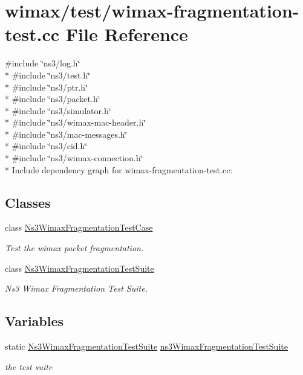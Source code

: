 \hypertarget{wimax-fragmentation-test_8cc}{}\section{wimax/test/wimax-\/fragmentation-\/test.cc File Reference}
\label{wimax-fragmentation-test_8cc}
{\ttfamily \#include \char`\"{}ns3/log.\+h\char`\"{}}\\*
{\ttfamily \#include \char`\"{}ns3/test.\+h\char`\"{}}\\*
{\ttfamily \#include \char`\"{}ns3/ptr.\+h\char`\"{}}\\*
{\ttfamily \#include \char`\"{}ns3/packet.\+h\char`\"{}}\\*
{\ttfamily \#include \char`\"{}ns3/simulator.\+h\char`\"{}}\\*
{\ttfamily \#include \char`\"{}ns3/wimax-\/mac-\/header.\+h\char`\"{}}\\*
{\ttfamily \#include \char`\"{}ns3/mac-\/messages.\+h\char`\"{}}\\*
{\ttfamily \#include \char`\"{}ns3/cid.\+h\char`\"{}}\\*
{\ttfamily \#include \char`\"{}ns3/wimax-\/connection.\+h\char`\"{}}\\*
Include dependency graph for wimax-\/fragmentation-\/test.cc\+:
\subsection*{Classes}
\begin{DoxyCompactItemize}
\item 
class \hyperlink{classNs3WimaxFragmentationTestCase}{Ns3\+Wimax\+Fragmentation\+Test\+Case}
\begin{DoxyCompactList}\small\item\em Test the wimax packet fragmentation. \end{DoxyCompactList}\item 
class \hyperlink{classNs3WimaxFragmentationTestSuite}{Ns3\+Wimax\+Fragmentation\+Test\+Suite}
\begin{DoxyCompactList}\small\item\em Ns3 Wimax Fragmentation Test Suite. \end{DoxyCompactList}\end{DoxyCompactItemize}
\subsection*{Variables}
\begin{DoxyCompactItemize}
\item 
static \hyperlink{classNs3WimaxFragmentationTestSuite}{Ns3\+Wimax\+Fragmentation\+Test\+Suite} \hyperlink{wimax-fragmentation-test_8cc_ad8dbda94d3a9d7f77b8bed10c342b60b}{ns3\+Wimax\+Fragmentation\+Test\+Suite}
\begin{DoxyCompactList}\small\item\em the test suite \end{DoxyCompactList}\end{DoxyCompactItemize}


